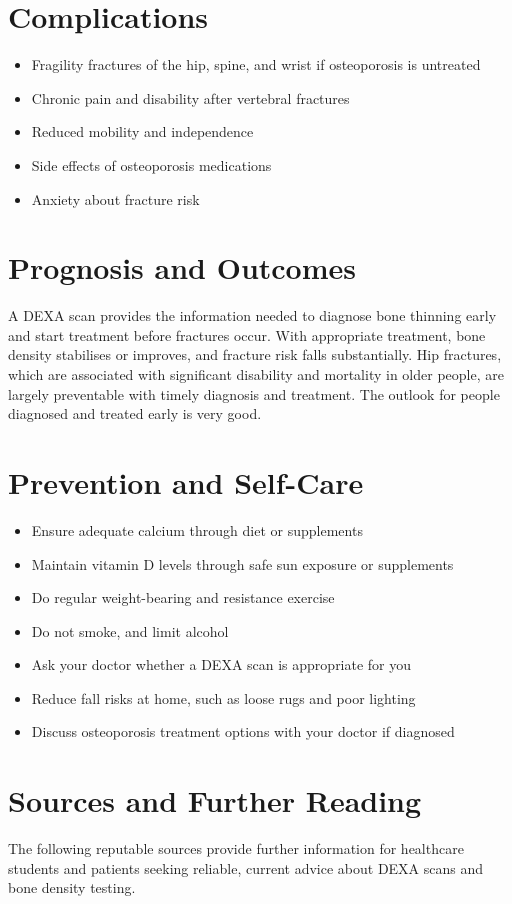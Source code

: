 \section*{Complications}
\begin{itemize}
    \item Fragility fractures of the hip, spine, and wrist if osteoporosis is untreated
    \item Chronic pain and disability after vertebral fractures
    \item Reduced mobility and independence
    \item Side effects of osteoporosis medications
    \item Anxiety about fracture risk
\end{itemize}

\section*{Prognosis and Outcomes}
A DEXA scan provides the information needed to diagnose bone thinning early and start treatment before fractures occur. With appropriate treatment, bone density stabilises or improves, and fracture risk falls substantially. Hip fractures, which are associated with significant disability and mortality in older people, are largely preventable with timely diagnosis and treatment. The outlook for people diagnosed and treated early is very good.

\section*{Prevention and Self-Care}
\begin{itemize}
    \item Ensure adequate calcium through diet or supplements
    \item Maintain vitamin D levels through safe sun exposure or supplements
    \item Do regular weight-bearing and resistance exercise
    \item Do not smoke, and limit alcohol
    \item Ask your doctor whether a DEXA scan is appropriate for you
    \item Reduce fall risks at home, such as loose rugs and poor lighting
    \item Discuss osteoporosis treatment options with your doctor if diagnosed
\end{itemize}

\section*{Sources and Further Reading}
The following reputable sources provide further information for healthcare students and patients seeking reliable, current advice about DEXA scans and bone density testing.

